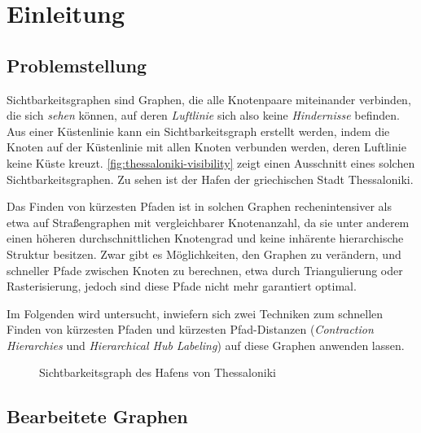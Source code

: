 \chapter{Einleitung}

\section{Problemstellung}
Sichtbarkeitsgraphen sind Graphen, die alle Knotenpaare miteinander verbinden, die sich \emph{sehen} können, auf deren \emph{Luftlinie} sich also keine \emph{Hindernisse} befinden.
Aus einer Küstenlinie kann ein Sichtbarkeitsgraph erstellt werden, indem die Knoten auf der Küstenlinie mit allen Knoten verbunden werden, deren Luftlinie keine Küste kreuzt.
\autoref{fig:thessaloniki-visibility} zeigt einen Ausschnitt eines solchen Sichtbarkeitsgraphen.
Zu sehen ist der Hafen der griechischen Stadt Thessaloniki.

Das Finden von kürzesten Pfaden ist in solchen Graphen rechenintensiver als etwa auf Straßengraphen mit vergleichbarer Knotenanzahl, da sie unter anderem einen höheren durchschnittlichen Knotengrad und keine inhärente hierarchische Struktur besitzen.
Zwar gibt es Möglichkeiten, den Graphen zu verändern, und schneller Pfade zwischen Knoten zu berechnen, etwa durch Triangulierung oder Rasterisierung, jedoch sind diese Pfade nicht mehr garantiert optimal.

Im Folgenden wird untersucht, inwiefern sich zwei Techniken zum schnellen Finden von kürzesten Pfaden und kürzesten Pfad-Distanzen (\emph{Contraction Hierarchies} und \emph{Hierarchical Hub Labeling}) auf diese Graphen anwenden lassen.

\begin{figure}[ht]%
    \centering
    \caption{Sichtbarkeitsgraph des Hafens von Thessaloniki}%
    \label{fig:thessaloniki-visibility}%
\end{figure}

\section{Bearbeitete Graphen}

